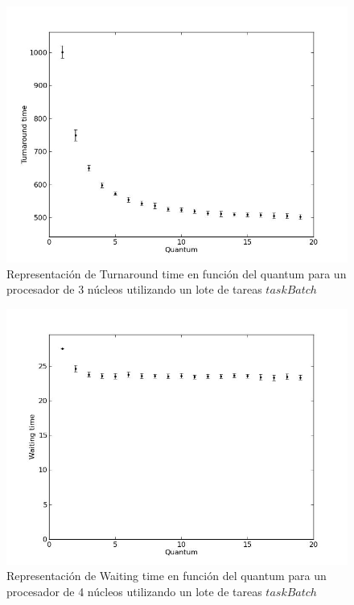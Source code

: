 \begin{figure}[H]
	\begin{center}
		  \includegraphics[scale=0.3]{graficos/cores_3_ta.jpg}
		  \caption{Representación de Turnaround time en función del quantum para un procesador de 3 núcleos utilizando un lote de tareas $taskBatch$}
		  \label{fig:contra1}
	\end{center}
\end{figure}

\begin{figure}[H]
	\begin{center}
		  \includegraphics[scale=0.3]{graficos/cores_4_wt.jpg}
		  \caption{Representación de Waiting time en función del quantum para un procesador de 4 núcleos utilizando un lote de tareas $taskBatch$}
		  \label{fig:contra1}
	\end{center}
\end{figure}

